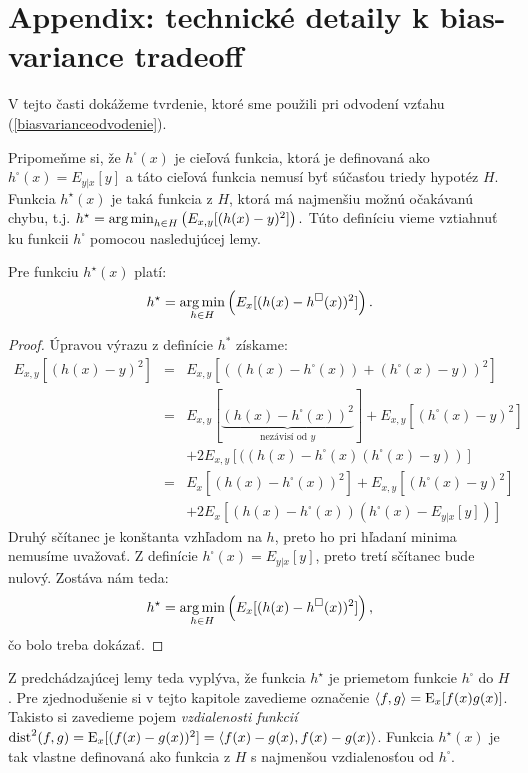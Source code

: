 \section{Appendix: technické detaily k bias-variance tradeoff}
\label{tradeoff:tech}

\def\dist{\text{dist}}

V tejto časti dokážeme tvrdenie, ktoré sme použili pri odvodení vzťahu
(\ref{biasvarianceodvodenie}).

Pripomeňme si, že $h^{\square}(x)$ je cieľová funkcia, ktorá je
definovaná ako $h^{\square}(x)=E_{y|x}[y]$ a táto cieľová funkcia
nemusí byť súčasťou triedy hypotéz $H$.
Funkcia $h^\star(x)$ je taká funkcia z $H$, ktorá má najmenšiu možnú
očakávanú chybu, t.j. $h^\star = \operatorname*{{arg\,min}}_{h\in H} \left(
E_{x,y}[(h(x)-y)^2] \right).$ Túto definíciu vieme vztiahnuť ku funkcii
$h^\square$ pomocou nasledujúcej lemy.

\begin{lemma}
  Pre funkciu $h^\star(x)$ platí:
  $$h^\star=\operatorname*{{arg\,min}}_{h\in H} \left(E_{x}[(h(x)-h^\square(x))^2] \right).$$
\label{lemaprojekcia}
\end{lemma}

\begin{proof}
Úpravou výrazu z definície $h^*$ získame:
\begin{eqnarray*}
  E_{x,y}[(h(x)-y)^2] & = & E_{x,y}[((h(x)-h^{\square}(x))+(h^{\square}(x)-y))^2]\\
  & = & E_{x,y}[\underbrace{(h(x)-h^{\square}(x))^2}_{\text{nezávisí od $y$}}] + E_{x,y}[(h^{\square}(x)-y)^2]\\ && + 2E_{x,y}[((h(x)-h^{\square}(x)(h^{\square}(x)-y))]\\
    & = & E_x[(h(x)-h^{\square}(x))^2] + E_{x,y}[(h^{\square}(x)-y)^2]\\&&+ 2E_x[(h(x)-h^{\square}(x))(h^{\square}(x)-E_{y|x}[y])]
\end{eqnarray*}
Druhý sčítanec je konštanta vzhľadom na $h$, preto ho pri hľadaní
minima nemusíme uvažovať. Z definície $h^{\square}(x)=E_{y|x}[y]$, preto tretí
sčítanec bude nulový. Zostáva nám teda:
$$h^\star=\operatorname*{{arg\,min}}_{h\in H} \left(E_{x}[(h(x)-h^\square(x))^2] \right),$$
čo bolo treba dokázať.
\end{proof}

\noindent
Z predchádzajúcej lemy teda vyplýva, že funkcia $h^\star$ je priemetom
funkcie $h^\square$ do $H$.
Pre zjednodušenie si v tejto kapitole
zavedieme označenie $\langle f,g \rangle = \operatorname*{\mathrm{E}}_x[f(x)g(x)]$.  Takisto
si zavedieme pojem \emph{vzdialenosti funkcií}
$\dist^2(f,g)=\E_x[(f(x)-g(x))^2]=\langle f(x)-g(x),f(x)-g(x)
\rangle$.  Funkcia $h^{\star}(x)$ je tak vlastne definovaná ako
funkcia z $H$ s najmenšou vzdialenosťou od $h^\square$.

